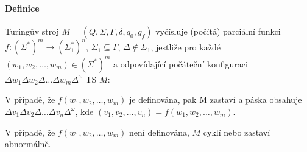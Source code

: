 \paragraph*{Definice} Turingův stroj $M = (Q, \Sigma, \Gamma, \delta, q_0, g_f)$ vyčísluje (počítá) parciální funkci $f : (\Sigma^{*})^m \rightarrow (\Sigma_1^{*})^n$, $\Sigma_1 \subseteq \Gamma$, $\Delta \not\in \Sigma_1$, jestliže pro každé $(w_1, w_2, \ldots, w_m) \in (\Sigma^{*})^m$ a odpovídající počáteční konfiguraci $\Delta w_1 \Delta w_2 \Delta \ldots \Delta w_m \Delta^{\omega}$ TS $M$: \begin{compactenum}
    \item V případě, že $f(w_1, w_2, \ldots, w_m)$ je definována, pak M zastaví a páska obsahuje $\Delta v_1 \Delta v_2 \Delta \ldots \Delta v_n \Delta^{\omega}$, kde $(v_1, v_2, \ldots, v_n) = f(w_1, w_2, \ldots, w_m)$.
    \item V případě, že $f(w_1, w_2, \ldots, w_m)$ není definována, $M$ cyklí nebo zastaví abnormálně.
\end{compactenum}
